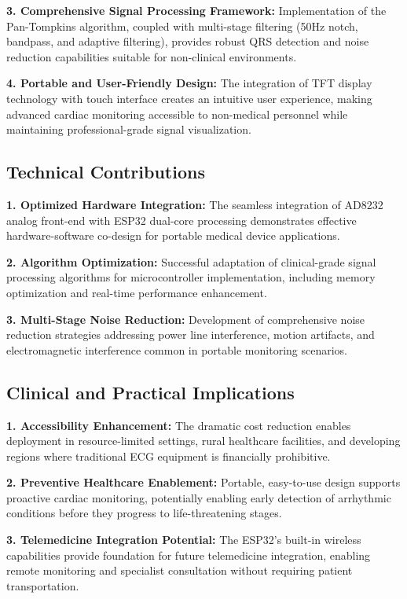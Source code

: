 \documentclass[12pt,a4paper]{article}
\begin{document}
\textbf{3. Comprehensive Signal Processing Framework:}
Implementation of the Pan-Tompkins algorithm, coupled with multi-stage filtering (50Hz notch, bandpass, and adaptive filtering), provides robust QRS detection and noise reduction capabilities suitable for non-clinical environments.

\textbf{4. Portable and User-Friendly Design:}
The integration of TFT display technology with touch interface creates an intuitive user experience, making advanced cardiac monitoring accessible to non-medical personnel while maintaining professional-grade signal visualization.

\subsection{Technical Contributions}

\textbf{1. Optimized Hardware Integration:}
The seamless integration of AD8232 analog front-end with ESP32 dual-core processing demonstrates effective hardware-software co-design for portable medical device applications.

\textbf{2. Algorithm Optimization:}
Successful adaptation of clinical-grade signal processing algorithms for microcontroller implementation, including memory optimization and real-time performance enhancement.

\textbf{3. Multi-Stage Noise Reduction:}
Development of comprehensive noise reduction strategies addressing power line interference, motion artifacts, and electromagnetic interference common in portable monitoring scenarios.

\subsection{Clinical and Practical Implications}

\textbf{1. Accessibility Enhancement:}
The dramatic cost reduction enables deployment in resource-limited settings, rural healthcare facilities, and developing regions where traditional ECG equipment is financially prohibitive.

\textbf{2. Preventive Healthcare Enablement:}
Portable, easy-to-use design supports proactive cardiac monitoring, potentially enabling early detection of arrhythmic conditions before they progress to life-threatening stages.

\textbf{3. Telemedicine Integration Potential:}
The ESP32's built-in wireless capabilities provide foundation for future telemedicine integration, enabling remote monitoring and specialist consultation without requiring patient transportation.
\end{document}
